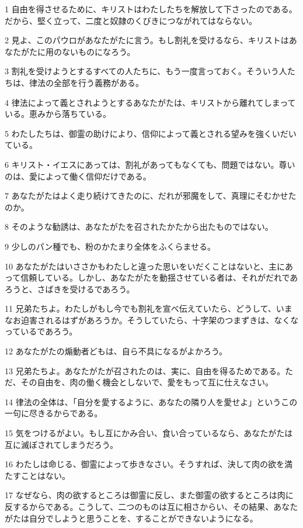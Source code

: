 \par 1 自由を得させるために、キリストはわたしたちを解放して下さったのである。だから、堅く立って、二度と奴隷のくびきにつながれてはならない。
\par 2 見よ、このパウロがあなたがたに言う。もし割礼を受けるなら、キリストはあなたがたに用のないものになろう。
\par 3 割礼を受けようとするすべての人たちに、もう一度言っておく。そういう人たちは、律法の全部を行う義務がある。
\par 4 律法によって義とされようとするあなたがたは、キリストから離れてしまっている。恵みから落ちている。
\par 5 わたしたちは、御霊の助けにより、信仰によって義とされる望みを強くいだいている。
\par 6 キリスト・イエスにあっては、割礼があってもなくても、問題ではない。尊いのは、愛によって働く信仰だけである。
\par 7 あなたがたはよく走り続けてきたのに、だれが邪魔をして、真理にそむかせたのか。
\par 8 そのような勧誘は、あなたがたを召されたかたから出たものではない。
\par 9 少しのパン種でも、粉のかたまり全体をふくらませる。
\par 10 あなたがたはいささかもわたしと違った思いをいだくことはないと、主にあって信頼している。しかし、あなたがたを動揺させている者は、それがだれであろうと、さばきを受けるであろう。
\par 11 兄弟たちよ。わたしがもし今でも割礼を宣べ伝えていたら、どうして、いまなお迫害されるはずがあろうか。そうしていたら、十字架のつまずきは、なくなっているであろう。
\par 12 あなたがたの煽動者どもは、自ら不具になるがよかろう。
\par 13 兄弟たちよ。あなたがたが召されたのは、実に、自由を得るためである。ただ、その自由を、肉の働く機会としないで、愛をもって互に仕えなさい。
\par 14 律法の全体は、「自分を愛するように、あなたの隣り人を愛せよ」というこの一句に尽きるからである。
\par 15 気をつけるがよい。もし互にかみ合い、食い合っているなら、あなたがたは互に滅ぼされてしまうだろう。
\par 16 わたしは命じる、御霊によって歩きなさい。そうすれば、決して肉の欲を満たすことはない。
\par 17 なぜなら、肉の欲するところは御霊に反し、また御霊の欲するところは肉に反するからである。こうして、二つのものは互に相さからい、その結果、あなたがたは自分でしようと思うことを、することができないようになる。
